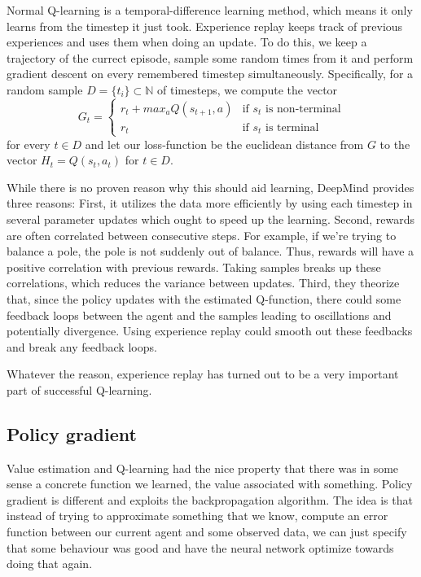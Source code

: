 \documentclass{article}
\theoremstyle{changedot}
\theoremstyle{changedotbreak}
\theoremstyle{nonumberplain}
\begin{document}
Normal Q-learning is a temporal-difference learning method, which means it only learns from the timestep it just took. Experience replay keeps track of previous experiences and uses them when doing an update. To do this, we keep a trajectory of the currect episode, sample some random times from it and perform gradient descent on every remembered timestep simultaneously. Specifically, for a random sample $D = \{t_{i}\} \subset \mathbb N$ of timesteps, we compute the vector
\[G_{t} =  \begin{cases}
    r_{t} + max_{a} Q(s_{t+1}, a) & \text{if $s_{t}$ is non-terminal} \\
    r_{t} & \text{if $s_{t}$ is terminal}
  \end{cases} \]
for every $t \in D$ and let our loss-function be the euclidean distance from $G$ to the vector $H_{t} = Q(s_{t}, a_{t})$ for $t \in D$.

While there is no proven reason why this should aid learning, DeepMind provides three reasons: First, it utilizes the data more efficiently by using each timestep in several parameter updates which ought to speed up the learning. Second, rewards are often correlated between consecutive steps. For example, if we're trying to balance a pole, the pole is not suddenly out of balance. Thus, rewards will have a positive correlation with previous rewards. Taking samples breaks up these correlations, which reduces the variance between updates. Third, they theorize that, since the policy updates with the estimated Q-function, there could some feedback loops between the agent and the samples leading to oscillations and potentially divergence. Using experience replay could smooth out these feedbacks and break any feedback loops.

Whatever the reason, experience replay has turned out to be a very important part of successful Q-learning.

\subsection{Policy gradient}
Value estimation and Q-learning had the nice property that there was in some sense a concrete function we learned, the value associated with something. Policy gradient is different and exploits the backpropagation algorithm. The idea is that instead of trying to approximate something that we know, compute an error function between our current agent and some observed data, we can just specify that some behaviour was good and have the neural network optimize towards doing that again.
\end{document}
